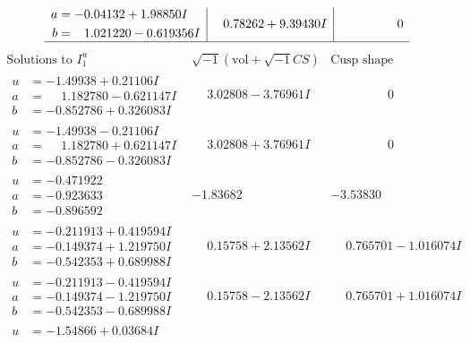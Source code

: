 \documentclass[1p]{elsarticle_modified}
\theoremstyle{definition}
\newcommand{\I}{\sqrt{-1}}
\begin{document}
$$\begin{array}{c|c|c}
\begin{aligned}
a &= -0.04132 + 1.98850 I \\
b &= \phantom{-}1.021220 - 0.619356 I\end{aligned}
 & \phantom{-}0.78262 + 9.39430 I & \phantom{-0.000000 } 0\\
 \hline 
 \end{array}$$\newpage$$\begin{array}{c|c|c}  
\text{Solutions to }I^u_{1}& \I (\text{vol} + \sqrt{-1}CS) & \text{Cusp shape}\\
 \hline 
\begin{aligned}
u &= -1.49938 + 0.21106 I \\
a &= \phantom{-}1.182780 - 0.621147 I \\
b &= -0.852786 + 0.326083 I\end{aligned}
 & \phantom{-}3.02808 - 3.76961 I & \phantom{-0.000000 } 0 \\ \hline\begin{aligned}
u &= -1.49938 - 0.21106 I \\
a &= \phantom{-}1.182780 + 0.621147 I \\
b &= -0.852786 - 0.326083 I\end{aligned}
 & \phantom{-}3.02808 + 3.76961 I & \phantom{-0.000000 } 0 \\ \hline\begin{aligned}
u &= -0.471922\phantom{ +0.000000I} \\
a &= -0.923633\phantom{ +0.000000I} \\
b &= -0.896592\phantom{ +0.000000I}\end{aligned}
 & -1.83682\phantom{ +0.000000I} & -3.53830\phantom{ +0.000000I} \\ \hline\begin{aligned}
u &= -0.211913 + 0.419594 I \\
a &= -0.149374 + 1.219750 I \\
b &= -0.542353 + 0.689988 I\end{aligned}
 & \phantom{-}0.15758 + 2.13562 I & \phantom{-}0.765701 - 1.016074 I \\ \hline\begin{aligned}
u &= -0.211913 - 0.419594 I \\
a &= -0.149374 - 1.219750 I \\
b &= -0.542353 - 0.689988 I\end{aligned}
 & \phantom{-}0.15758 - 2.13562 I & \phantom{-}0.765701 + 1.016074 I \\ \hline\begin{aligned}
u &= -1.54866 + 0.03684 I \\

\end{aligned}
\end{array}$$
\end{document}
